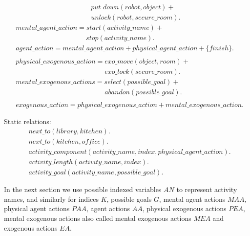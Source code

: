 \documentclass[11pt, oneside]{article}
\begin{document}
\begin{allowdisplaybreaks}
\begin{align*}
  &\qquad\qquad\qquad\qquad\qquad\quad put\_down(robot,object) +\\
  &\qquad\qquad\qquad\qquad\qquad\quad unlock(robot,secure\_room).\\
&mental\_agent\_action =   start(activity\_name) +\\
  &\qquad\qquad\qquad\qquad\qquad\; stop(activity\_name).\\
  &agent\_action = mental\_agent\_action + physical\_agent\_action + \{finish\}.\\
\\
&physical\_exogenous\_action = exo\_move(object, room) + \\
  &\qquad\qquad\qquad\qquad\qquad\qquad\quad exo\_lock(secure\_room).\\
  &mental\_exogenous\_actions = select(possible\_goal) + \\
&\qquad\qquad\qquad\qquad\qquad\qquad\quad  abandon(possible\_goal).\\
\\
&exogenous\_action = physical\_exogenous\_action + mental\_exogenous\_action.
\end{align*}
\end{allowdisplaybreaks}



Static relations:
\begin{align*}
  &next\_to(library, kitchen).\\
  &next\_to(kitchen, office).\\
  &activity\_component(activity\_name, index, physical\_agent\_action).\\
  &activity\_length(activity\_name, index).\\
  &activity\_goal(activity\_name, possible\_goal).
\end{align*}


In the next section we use possible indexed variables $AN$ to represent activity names, and similarly for indices $K$, possible goals $G$, mental agent actions $MAA$, physical agent actions $PAA$,
agent actions $AA$, physical exogenous actions $PEA$, mental exogenous actions also called mental exogenous actions $MEA$ and exogenous actions $EA$.
\end{document}
